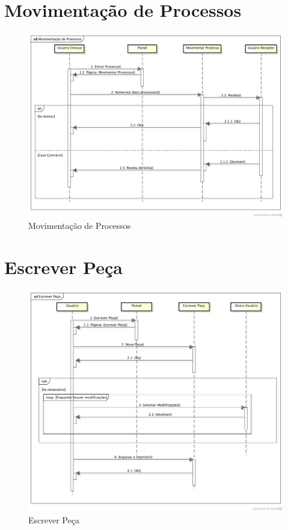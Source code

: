 \documentclass[12pt,a4paper]{report}
\begin{document}
\section{Movimentação de Processos}
\begin{figure}[H]
\centering
\includegraphics[width=\textwidth]{movimentacao-de-processos.png}
\caption{Movimentação de Processos}
\label{fig:movimentacao}
\end{figure}

\section{Escrever Peça}
\begin{figure}[H]
\centering
\includegraphics[width=\textwidth]{escrever-peca.png}
\caption{Escrever Peça}
\label{fig:escrever}
\end{figure}
\end{document}
